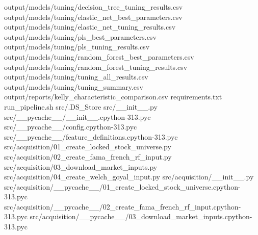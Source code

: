 \documentclass[
  11pt,
  a4paper]{article}
\newenvironment{Shaded}{}{}
\newcommand{\NormalTok}[1]{#1}
\begin{document}
\begin{Shaded}
\begin{Highlighting}[]
\NormalTok{output/models/tuning/decision\_\allowbreak{}tree\_\allowbreak{}tuning\_\allowbreak{}results.csv}
\NormalTok{output/models/tuning/elastic\_\allowbreak{}net\_\allowbreak{}best\_\allowbreak{}parameters.csv}
\NormalTok{output/models/tuning/elastic\_\allowbreak{}net\_\allowbreak{}tuning\_\allowbreak{}results.csv}
\NormalTok{output/models/tuning/pls\_\allowbreak{}best\_\allowbreak{}parameters.csv}
\NormalTok{output/models/tuning/pls\_\allowbreak{}tuning\_\allowbreak{}results.csv}
\NormalTok{output/models/tuning/random\_\allowbreak{}forest\_\allowbreak{}best\_\allowbreak{}parameters.csv}
\NormalTok{output/models/tuning/random\_\allowbreak{}forest\_\allowbreak{}tuning\_\allowbreak{}results.csv}
\NormalTok{output/models/tuning/tuning\_\allowbreak{}all\_\allowbreak{}results.csv}
\NormalTok{output/models/tuning/tuning\_\allowbreak{}summary.csv}
\NormalTok{output/reports/kelly\_\allowbreak{}characteristic\_\allowbreak{}comparison.csv}
\NormalTok{requirements.txt}
\NormalTok{run\_\allowbreak{}pipeline.sh}
\NormalTok{src/.DS\_\allowbreak{}Store}
\NormalTok{src/\_\allowbreak{}\_\allowbreak{}init\_\allowbreak{}\_\allowbreak{}.py}
\NormalTok{src/\_\allowbreak{}\_\allowbreak{}pycache\_\allowbreak{}\_\allowbreak{}/\_\allowbreak{}\_\allowbreak{}init\_\allowbreak{}\_\allowbreak{}.cpython{-}313.pyc}
\NormalTok{src/\_\allowbreak{}\_\allowbreak{}pycache\_\allowbreak{}\_\allowbreak{}/config.cpython{-}313.pyc}
\NormalTok{src/\_\allowbreak{}\_\allowbreak{}pycache\_\allowbreak{}\_\allowbreak{}/feature\_\allowbreak{}definitions.cpython{-}313.pyc}
\NormalTok{src/acquisition/01\_\allowbreak{}create\_\allowbreak{}locked\_\allowbreak{}stock\_\allowbreak{}universe.py}
\NormalTok{src/acquisition/02\_\allowbreak{}create\_\allowbreak{}fama\_\allowbreak{}french\_\allowbreak{}rf\_\allowbreak{}input.py}
\NormalTok{src/acquisition/03\_\allowbreak{}download\_\allowbreak{}market\_\allowbreak{}inputs.py}
\NormalTok{src/acquisition/04\_\allowbreak{}create\_\allowbreak{}welch\_\allowbreak{}goyal\_\allowbreak{}input.py}
\NormalTok{src/acquisition/\_\allowbreak{}\_\allowbreak{}init\_\allowbreak{}\_\allowbreak{}.py}
\NormalTok{src/acquisition/\_\allowbreak{}\_\allowbreak{}pycache\_\allowbreak{}\_\allowbreak{}/01\_\allowbreak{}create\_\allowbreak{}locked\_\allowbreak{}stock\_\allowbreak{}universe.cpython{-}313.pyc}
\NormalTok{src/acquisition/\_\allowbreak{}\_\allowbreak{}pycache\_\allowbreak{}\_\allowbreak{}/02\_\allowbreak{}create\_\allowbreak{}fama\_\allowbreak{}french\_\allowbreak{}rf\_\allowbreak{}input.cpython{-}313.pyc}
\NormalTok{src/acquisition/\_\allowbreak{}\_\allowbreak{}pycache\_\allowbreak{}\_\allowbreak{}/03\_\allowbreak{}download\_\allowbreak{}market\_\allowbreak{}inputs.cpython{-}313.pyc}

\end{Highlighting}
\end{Shaded}
\end{document}
